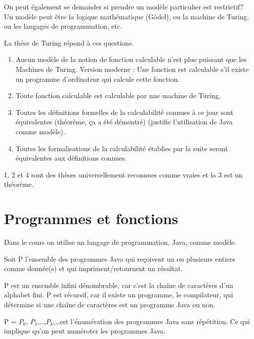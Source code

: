 On peut également se demander si prendre un modèle particulier est restrictif? Un modèle peut être la logique mathématique (Gödel), ou la machine de Turing, ou les langages de programmation, etc.

La thèse de Turing répond à ces questions.
\begin{enumerate}
	\item Aucun modèle de la notion de fonction calculable n'est plus puissant que les Machines de Turing.
		Version moderne : Une fonction est calculable s'il existe un programme d'ordinateur qui calcule cette fonction.
	\item Toute fonction calculable est calculable par une machine de Turing.
	\item Toutes les définitions formelles de la calculabilité connues à ce jour sont équivalentes (théorème, ça a été démontré) (justifie l'utilisation de Java comme modèle).
	\item Toutes les formalisations de la calculabilité établies par la
		suite seront équivalentes aux définitions connues.
\end{enumerate}
1, 2 et 4 sont des thèses universellement reconnues comme vraies et la 3 est un théorème.


\section{Programmes et fonctions}
\label{sec:programmes_et_fonctions}
Dans le cours on utilise un langage de programmation, Java, comme modèle.

\begin{mydef}[P]
	Soit P l'ensemble des programmes Java qui reçoivent un ou plusieurs entiers comme donnée(s) et qui impriment/retournent un résultat.
\end{mydef}

\begin{myprop}
	P est un ensemble infini dénombrable, car c'est la chaîne de caractères d'un alphabet fini. P est récursif, car il existe un programme, le compilateur, qui détermine si une chaîne de caractères est un programme Java ou non.
\end{myprop}

\begin{mydef}[Énumération de P]
	P = $P_0$, $P_1$,\dots,$P_k$,\dots est l'énumération des programmes Java sans répétition. Ce qui implique qu'on peut numéroter les programmes Java.\\
\end{mydef}

